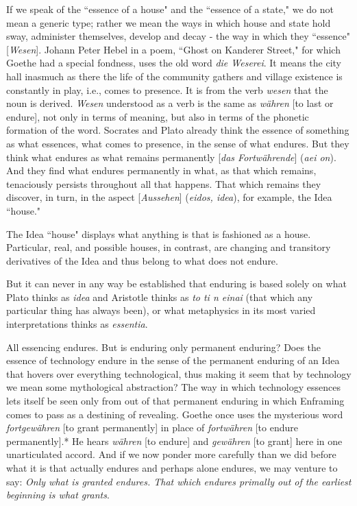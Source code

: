 If we speak of the ``essence of a house" and the ``essence of a state," we do not mean a generic type; rather we mean the ways in which house and state hold sway, administer themselves, develop and decay - the way in which they ``essence" [\textit{Wesen}]. Johann Peter Hebel in a poem, ``Ghost on Kanderer Street," for which Goethe had a special fondness, uses the old word \textit{die Weserei}. It means the city hall inasmuch as there the life of the community gathers and village existence is constantly in play, i.e., comes to presence. It is from the verb \textit{wesen} that the noun is derived. \textit{Wesen} understood as a verb is the same as \textit{w\"{a}hren} [to last or endure], not only in terms of meaning, but also in terms of the phonetic formation of the word. Socrates and Plato already think the essence of something as what essences, what comes to presence, in the sense of what endures. But they think what endures as what remains permanently [\textit{das Fortw\"{a}hrende}] (\textit{aei on}). And they find what endures permanently in what, as that which remains, tenaciously persists throughout all that happens. That which remains they discover, in turn, in the aspect [\textit{Aussehen}] (\textit{eidos, idea}), for example, the Idea ``house."

The Idea ``house" displays what anything is that is fashioned as a house. Particular, real, and possible houses, in contrast, are changing and transitory derivatives of the Idea and thus belong to what does not endure.

But it can never in any way be established that enduring is based solely on what Plato thinks as \textit{idea} and Aristotle thinks as \textit{to ti n einai} (that which any particular thing has always been), or what metaphysics in its most varied interpretations thinks as \textit{essentia}.

All essencing endures. But is enduring only permanent enduring? Does the essence of technology endure in the sense of the permanent enduring of an Idea that hovers over everything technological, thus making it seem that by technology we mean some mythological abstraction? The way in which technology essences lets itself be seen only from out of that permanent enduring in which Enframing comes to pass as a destining of revealing. Goethe once uses the mysterious word \textit{fortgew\"{a}hren} [to grant permanently] in place of \textit{fortw\"{a}hren} [to endure permanently].* He hears \textit{w\"{a}hren} [to endure] and \textit{gew\"{a}hren} [to grant] here in one unarticulated accord. And if we now ponder more carefully than we did before what it is that actually endures and perhaps alone endures, we may venture to say: \textit{Only what is granted endures. That which endures primally out of the earliest beginning is what grants}. 

